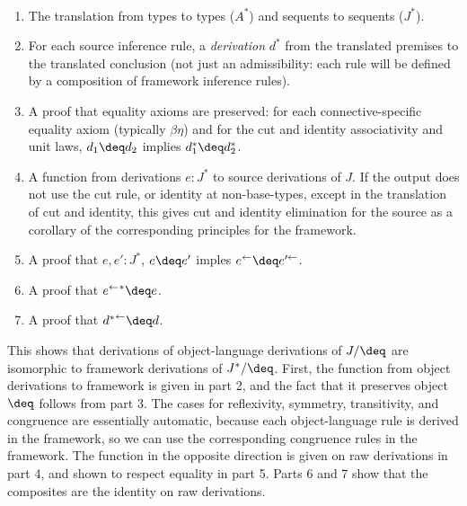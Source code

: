 \begin{definition} ~
\begin{enumerate}
\item The translation from types to types ($A^*$) and sequents to
  sequents ($J^*$).

\item For each source inference rule, a \emph{derivation} $d^*$ from the
  translated premises to the translated conclusion (not just an
  admissibility: each rule will be defined by a composition of framework
  inference rules).

\item A proof that equality axioms are preserved: for each
  connective-specific equality axiom (typically $\beta\eta$) and for the
  cut and identity associativity and unit laws, $d_1 \deq d_2$ implies
  $d_1^* \deq d_2^*$.

\item A function \backtrf{-} from derivations $e : J^*$ to source
  derivations of $J$.  If the output does not use the cut rule, or
  identity at non-base-types, except in the translation of cut and
  identity, this gives cut and identity elimination for the source as a
  corollary of the corresponding principles for the framework.

\item A proof that $e,e' : J^*$, $e \deq e'$ imples
  $\backtrf{e} \deq \backtrf{e'}$.  

\item A proof that ${\backtrf{e}}^* \deq e$.  

\item A proof that $\backtrf{{d^*}} \deq d$.  
\end{enumerate}
\end{definition}

This shows that derivations of object-language derivations of $J/\deq$
are isomorphic to framework derivations of $J^*/\deq$.  First, the
function from object derivations to framework is given in part 2, and
the fact that it preserves object $\deq$ follows from part 3.  The cases
for reflexivity, symmetry, transitivity, and congruence are essentially
automatic, because each object-language rule is derived in the
framework, so we can use the corresponding congruence rules in the
framework.  The function in the opposite direction is given on raw
derivations in part 4, and shown to respect equality in part 5.  Parts 6
and 7 show that the composites are the identity on raw derivations.  

